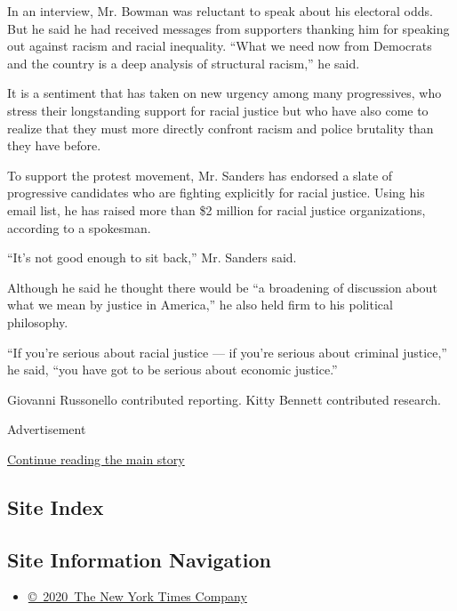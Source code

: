 In an interview, Mr. Bowman was reluctant to speak about his electoral
odds. But he said he had received messages from supporters thanking him
for speaking out against racism and racial inequality. ``What we need
now from Democrats and the country is a deep analysis of structural
racism,'' he said.

It is a sentiment that has taken on new urgency among many progressives,
who stress their longstanding support for racial justice but who have
also come to realize that they must more directly confront racism and
police brutality than they have before.

To support the protest movement, Mr. Sanders has endorsed a slate of
progressive candidates who are fighting explicitly for racial justice.
Using his email list, he has raised more than \$2 million for racial
justice organizations, according to a spokesman.

``It's not good enough to sit back,'' Mr. Sanders said.

Although he said he thought there would be ``a broadening of discussion
about what we mean by justice in America,'' he also held firm to his
political philosophy.

``If you're serious about racial justice --- if you're serious about
criminal justice,'' he said, ``you have got to be serious about economic
justice.''

Giovanni Russonello contributed reporting. Kitty Bennett contributed
research.

Advertisement

\protect\hyperlink{after-bottom}{Continue reading the main story}

\hypertarget{site-index}{%
\subsection{Site Index}\label{site-index}}

\hypertarget{site-information-navigation}{%
\subsection{Site Information
Navigation}\label{site-information-navigation}}

\begin{itemize}
\tightlist
\item
  \href{https://help.nytimes3xbfgragh.onion/hc/en-us/articles/115014792127-Copyright-notice}{©~2020~The
  New York Times Company}
\end{itemize}

